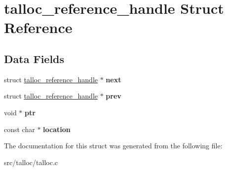 \hypertarget{structtalloc__reference__handle}{}\section{talloc\+\_\+reference\+\_\+handle Struct Reference}
\label{structtalloc__reference__handle}
\subsection*{Data Fields}
\begin{DoxyCompactItemize}
\item 
\hypertarget{structtalloc__reference__handle_a7f06e557b94612e4b6e19214faa11045}{}struct \hyperlink{structtalloc__reference__handle}{talloc\+\_\+reference\+\_\+handle} $\ast$ {\bfseries next}\label{structtalloc__reference__handle_a7f06e557b94612e4b6e19214faa11045}

\item 
\hypertarget{structtalloc__reference__handle_a23d1ac99ecd9ff4ef30109d18ad7ecf4}{}struct \hyperlink{structtalloc__reference__handle}{talloc\+\_\+reference\+\_\+handle} $\ast$ {\bfseries prev}\label{structtalloc__reference__handle_a23d1ac99ecd9ff4ef30109d18ad7ecf4}

\item 
\hypertarget{structtalloc__reference__handle_ad6878fd4f4989074b6d4221f6b012536}{}void $\ast$ {\bfseries ptr}\label{structtalloc__reference__handle_ad6878fd4f4989074b6d4221f6b012536}

\item 
\hypertarget{structtalloc__reference__handle_a9dd3fe72aa5c72498f952b0d6cd20842}{}const char $\ast$ {\bfseries location}\label{structtalloc__reference__handle_a9dd3fe72aa5c72498f952b0d6cd20842}

\end{DoxyCompactItemize}


The documentation for this struct was generated from the following file\+:\begin{DoxyCompactItemize}
\item 
src/talloc/talloc.\+c\end{DoxyCompactItemize}
